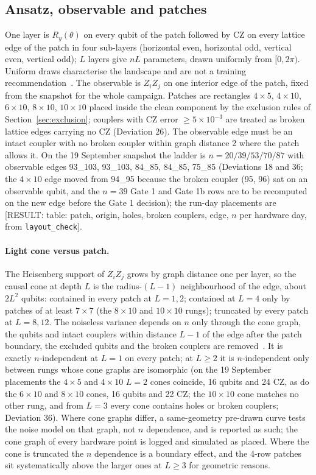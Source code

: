\documentclass[aps,prxquantum,reprint,superscriptaddress,nofootinbib,longbibliography,amsmath,amssymb]{revtex4-2}
\newcommand{\placeholder}[1]{\textcolor{red!70!black}{[RESULT: #1]}}
\begin{document}
\subsection{Ansatz, observable and patches}\label{sec:ansatz}
One layer is $R_y(\theta)$ on every qubit of the patch followed by CZ on every lattice edge of the patch in four sub-layers (horizontal even, horizontal odd, vertical even, vertical odd); $L$ layers give $nL$ parameters, drawn uniformly from $[0, 2\pi)$. Uniform draws characterise the landscape and are not a training recommendation~\cite{Larocca2025}. The observable is $Z_iZ_j$ on one interior edge of the patch, fixed from the snapshot for the whole campaign. Patches are rectangles $4\times5$, $4\times10$, $6\times10$, $8\times10$, $10\times10$ placed inside the clean component by the exclusion rules of Section~\ref{sec:exclusion}; couplers with CZ error $\geq 5\times10^{-3}$ are treated as broken lattice edges carrying no CZ (Deviation 26). The observable edge must be an intact coupler with no broken coupler within graph distance 2 where the patch allows it. On the 19 September snapshot the ladder is $n = 20/39/53/70/87$ with observable edges 93\_103, 93\_103, 84\_85, 84\_85, 75\_85 (Deviations 18 and 36; the $4\times10$ edge moved from 94\_95 because the broken coupler (95, 96) sat on an observable qubit, and the $n = 39$ Gate 1 and Gate 1b rows are to be recomputed on the new edge before the Gate 1 decision); the run-day placements are \placeholder{table: patch, origin, holes, broken couplers, edge, $n$ per hardware day, from \texttt{layout\_check}}.

\paragraph{Light cone versus patch.} The Heisenberg support of $Z_iZ_j$ grows by graph distance one per layer, so the causal cone at depth $L$ is the radius-$(L-1)$ neighbourhood of the edge, about $2L^2$ qubits: contained in every patch at $L = 1, 2$; contained at $L = 4$ only by patches of at least $7\times7$ (the $8\times10$ and $10\times10$ rungs); truncated by every patch at $L = 8, 12$. The noiseless variance depends on $n$ only through the cone graph, the qubits and intact couplers within distance $L - 1$ of the edge after the patch boundary, the excluded qubits and the broken couplers are removed~\cite{Uvarov2021}. It is exactly $n$-independent at $L = 1$ on every patch; at $L \geq 2$ it is $n$-independent only between rungs whose cone graphs are isomorphic (on the 19 September placements the $4\times5$ and $4\times10$ $L = 2$ cones coincide, 16 qubits and 24 CZ, as do the $6\times10$ and $8\times10$ cones, 16 qubits and 22 CZ; the $10\times10$ cone matches no other rung, and from $L = 3$ every cone contains holes or broken couplers; Deviation 36). Where cone graphs differ, a same-geometry pre-drawn curve tests the noise model on that graph, not $n$ dependence, and is reported as such; the cone graph of every hardware point is logged and simulated as placed. Where the cone is truncated the $n$ dependence is a boundary effect, and the 4-row patches sit systematically above the larger ones at $L \geq 3$ for geometric reasons.
\end{document}
